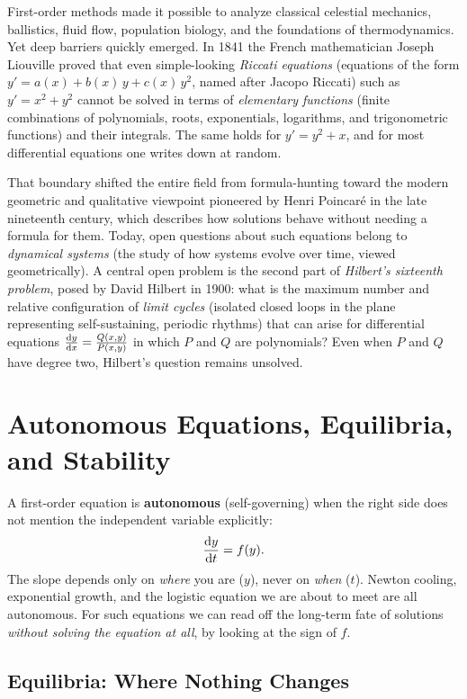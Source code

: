\begin{historybox}
First-order methods made it possible to analyze classical celestial mechanics, ballistics,
fluid flow, population biology, and the foundations of thermodynamics. Yet deep
barriers quickly emerged. In 1841 the French mathematician Joseph Liouville
proved that even simple-looking \emph{Riccati equations} (equations of the form
$y'=a(x)+b(x)\,y+c(x)\,y^2$, named after Jacopo Riccati) such as $y' = x^2 + y^2$ cannot
be solved in terms of \emph{elementary functions} (finite combinations of
polynomials, roots, exponentials, logarithms, and trigonometric functions) and
their integrals. The same holds for $y' = y^2 + x$, and for most differential
equations one writes down at random.

That boundary shifted the entire field from formula-hunting toward the modern
geometric and qualitative viewpoint pioneered by Henri Poincar\'e in the late
nineteenth century, which describes how solutions behave without needing a
formula for them.
Today, open questions about such equations belong to
\emph{dynamical systems} (the study of how systems evolve over time, viewed
geometrically). A central open problem is the second part of \emph{Hilbert's sixteenth
problem}, posed by David Hilbert in 1900: what is the maximum number and relative
configuration of \emph{limit cycles} (isolated closed loops in the plane
representing self-sustaining, periodic rhythms) that can arise for
differential equations $\frac{\mathrm{d} y}{\mathrm{d} x} = \frac{Q(x,y)}{P(x,y)}$ in which $P$ and $Q$ are
polynomials? Even when $P$ and $Q$ have degree two, Hilbert's question remains
unsolved.
\end{historybox}

\section{Autonomous Equations, Equilibria, and Stability}

A first-order equation is \textbf{autonomous} (self-governing) when the right side
does not mention the independent variable explicitly:
\[
  \frac{\mathrm{d} y}{\mathrm{d} t} = f(y).
\]
The slope depends only on \emph{where} you are ($y$), never on \emph{when} ($t$).
Newton cooling, exponential growth, and the logistic equation we are about to meet
are all autonomous. For such equations we can read off the long-term
fate of solutions \emph{without solving the equation at all}, by looking at the
sign of $f$.

\subsection{Equilibria: Where Nothing Changes}

